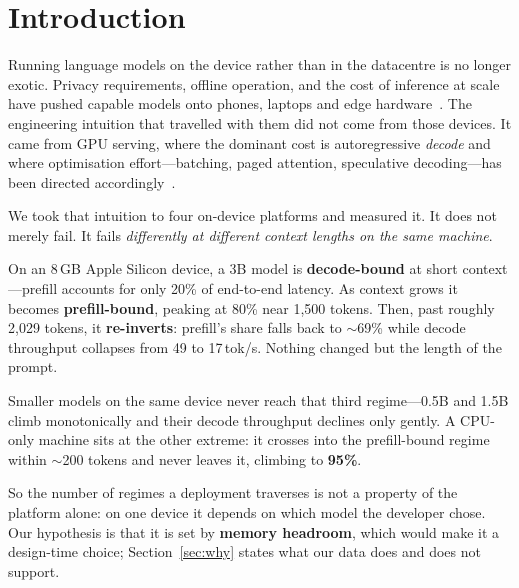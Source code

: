 \documentclass[sigconf,nonacm,10pt]{acmart}
\begin{document}
\maketitle

\section{Introduction}

Running language models on the device rather than in the datacentre is no longer exotic. Privacy requirements,
offline operation, and the cost of inference at scale have pushed capable models onto phones, laptops and edge
hardware~\cite{xu2024ondevicereview,liu2024mobilellm,xue2024powerinfer2}. The engineering intuition that
travelled with them did not come from those devices. It came from GPU serving, where the dominant cost is
autoregressive \emph{decode} and where optimisation effort---batching, paged attention, speculative
decoding---has been directed accordingly~\cite{kwon2023pagedattention,leviathan2023speculative}.

We took that intuition to four on-device platforms and measured it. It does not merely fail. It fails
\emph{differently at different context lengths on the same machine}.

On an 8\,GB Apple Silicon device, a 3B model is \textbf{decode-bound} at short context---prefill accounts for
only 20\% of end-to-end latency. As context grows it becomes \textbf{prefill-bound}, peaking at 80\% near
1{,}500 tokens. Then, past roughly 2{,}029 tokens, it \textbf{re-inverts}: prefill's share falls back to
$\sim$69\% while decode throughput collapses from 49 to 17\,tok/s. Nothing changed but the length of the prompt.

Smaller models on the same device never reach that third regime---0.5B and 1.5B climb monotonically and their
decode throughput declines only gently. A CPU-only machine sits at the other extreme: it crosses into the
prefill-bound regime within $\sim$200 tokens and never leaves it, climbing to \textbf{95\%}.

So the number of regimes a deployment traverses is not a property of the platform alone: on one device it
depends on which model the developer chose. Our hypothesis is that it is set by \textbf{memory headroom}, which
would make it a design-time choice; Section~\ref{sec:why} states what our data does and does not support.
\end{document}
